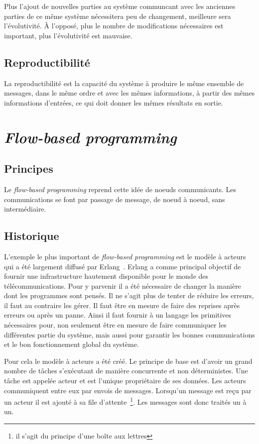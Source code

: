 \documentclass{article}
\begin{document}
Plus l'ajout de nouvelles parties au système communcant avec les anciennes parties
de ce même système nécessitera peu de changement, meilleure sera l'évolutivité.
À l'opposé, plus le nombre de modifications nécessaires est important, plus l'évolutivité
est mauvaise.

\subsection{Reproductibilité}
La reproductibilité est la capacité du système à produire le même ensemble de messages,
dans le même ordre et avec les mêmes informations, à partir des mêmes informations d'entrées,
ce qui doit donner les mêmes résultats en sortie.


\section{\emph{Flow-based programming}}\label{flow-based}

\subsection{Principes}\label{principes}

Le \emph{flow-based programming} reprend cette idée de noeuds
communicants. Les communications se font par passage de message, de noeud à noeud,
sans intermédiaire.

\subsection{Historique}\label{historique}
L'exemple le plus important de \emph{flow-based programming} est le modèle à acteurs~\cite{actors}
qui a été largement diffusé par Erlang~\cite{erlang}.
Erlang a comme principal objectif de fournir une infrastructure hautement disponible
pour le monde des télécommunications.
Pour y parvenir il a été nécessaire de changer la manière dont les programmes sont pensés.
Il ne s'agit plus de tenter de réduire les erreurs, il faut au contraire les gérer.
Il faut être en mesure de faire des reprises après erreurs ou après un panne.
Ainsi il faut fournir à un langage les primitives nécessaires pour, non seulement
être en mesure de faire communiquer les différentes partie du système, mais aussi
pour garantir les bonnes communications et le bon fonctionnement global du système.

Pour cela le modèle à acteurs a été créé. Le principe de base est d'avoir un grand
nombre de tâches s'exécutant de manière concurrente et non déterministes.
Une tâche est appelée acteur et est l'unique propriétaire de ses données.
Les acteurs communiquent entre eux par envois de messages.
Lorsqu'un message est reçu par un acteur il est ajouté à sa file d'attente~\footnote{il s'agit du principe d'une boîte aux lettres}.
Les messages sont donc traités un à un.
\end{document}
